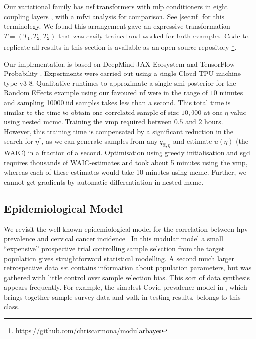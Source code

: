 Our variational family has \acrfull*{nsf} transformers \citep{Durkan2019neural} with \acrshort*{mlp} conditioners in eight coupling layers \citep{Dinh2016realnvp}, with a \acrshort*{mfvi} analysis for comparison. See \cref{sec:nf} for this terminology. We found this arrangement gave an expressive transformation $T=(T_1,T_2,T_2)$ that was easily trained and worked for both examples. Code to replicate all results in this section is available as an open-source repository \footnote{\url{https://github.com/chriscarmona/modularbayes}}.

Our implementation is based on DeepMind JAX Ecosystem \citep{deepmind2020jax} and TensorFlow Probability \citep{Dillon2017tfp}. Experiments were carried out using a single Cloud TPU machine type v3-8.
Qualitative runtimes to approximate a single \acrshort*{smi} posterior for the Random Effects example using our favoured \acrshort*{nf} were in the range of $10$ minutes and sampling 10000 iid samples takes less than a second. This total time is similar to the time to obtain one correlated sample of size $10,000$ at one $\eta$-value using nested \acrshort*{mcmc}. Training the \acrshort*{vmp} required between $0.5$ and $2$ hours. However, this training time is compensated by a significant reduction in the search for $\eta^*$, as we can generate samples from any $q_{\hat\alpha,\eta}$ and estimate $u(\eta)$ (the WAIC) in a fraction of a second. Optimisation using greedy initialisation and \acrshort*{sgd} requires thousands of WAIC-estimates and took about 5 minutes using the \acrshort*{vmp}, whereas each of these estimates would take 10 minutes using \acrshort*{mcmc}. Further, we cannot get gradients by automatic differentiation in nested \acrshort*{mcmc}.

\subsection{Epidemiological Model} \label{subsec:exp_epidemiology}

We revisit the well-known epidemiological model for the correlation between \acrfull*{hpv} prevalence and cervical cancer incidence \citep[see][for details]{Maucort-Boulch2008, Plummer2015cut}.
In this modular model a small ``expensive'' prospective trial controlling sample selection from the target population gives straightforward statistical modelling. A second much larger retrospective data set contains information about population parameters, but was gathered with little control over sample selection bias. This sort of data synthesis appears frequently. For example, the simplest Covid prevalence model in \cite{Nicholson2021covid}, which brings together sample survey data and walk-in testing results, belongs to this class.

